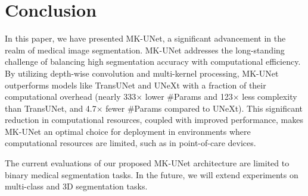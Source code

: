 \section{Conclusion}
\label{sec:conclusion}
In this paper, we have presented MK-UNet, a significant advancement in the realm of medical image segmentation. MK-UNet addresses the long-standing challenge of balancing high segmentation accuracy with computational efficiency. By utilizing depth-wise convolution and multi-kernel processing, MK-UNet outperforms models like TransUNet and UNeXt with a fraction of their computational overhead (nearly 333$\times$ lower \#Params and 123$\times$ less complexity than TransUNet, and 4.7$\times$ fewer \#Params compared to UNeXt). This significant reduction in computational resources, coupled with improved performance, makes MK-UNet an optimal choice for deployment in environments where computational resources are limited, such as in point-of-care devices. 

The current evaluations of our proposed MK-UNet architecture are limited to binary medical segmentation tasks. In the future, we will extend experiments on multi-class and 3D segmentation tasks.  
